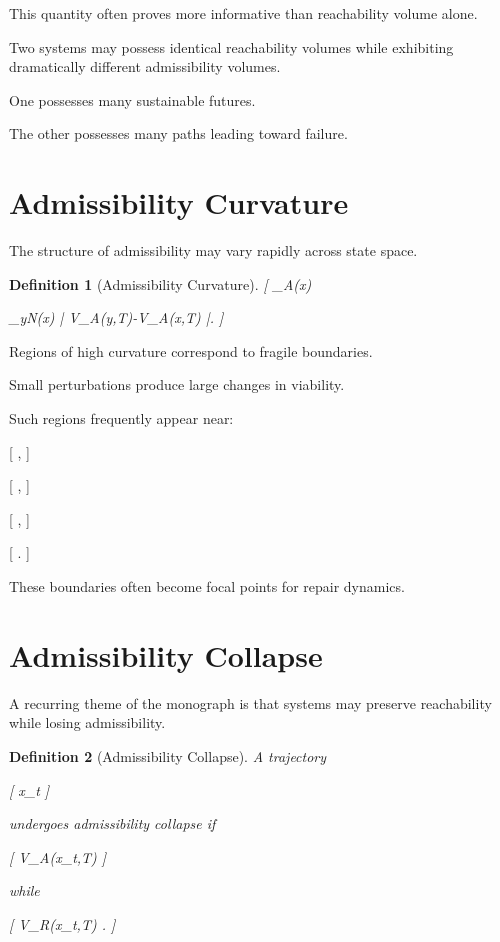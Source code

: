 \documentclass[11pt,oneside,openany]{book}
\newtheorem{definition}{Definition}[chapter] \newtheorem{theorem}{Theorem}[chapter] \newtheorem{proposition}{Proposition}[chapter] \newtheorem{lemma}{Lemma}[chapter] \newtheorem{corollary}{Corollary}[chapter] \newtheorem{remark}{Remark}[chapter]
\begin{document}
This quantity often proves more informative than reachability volume alone.

Two systems may possess identical reachability volumes while exhibiting dramatically different admissibility volumes.

One possesses many sustainable futures.

The other possesses many paths leading toward failure.

\section{Admissibility Curvature}

The structure of admissibility may vary rapidly across state space.

\begin{definition}[Admissibility Curvature]

[
\kappa_A(x)

\sum_{y\in N(x)}
\left|
V_A(y,T)-V_A(x,T)
\right|.
]

\end{definition}

Regions of high curvature correspond to fragile boundaries.

Small perturbations produce large changes in viability.

Such regions frequently appear near:

[
,
]

[
,
]

[
,
]

[
.
]

These boundaries often become focal points for repair dynamics.

\section{Admissibility Collapse}

A recurring theme of the monograph is that systems may preserve reachability while losing admissibility.

\begin{definition}[Admissibility Collapse]

A trajectory

[
x_t
]

undergoes admissibility collapse if

[
V_A(x_t,T)
]

while

[
V_R(x_t,T)
\not{}.
]

\end{definition}
\end{document}
